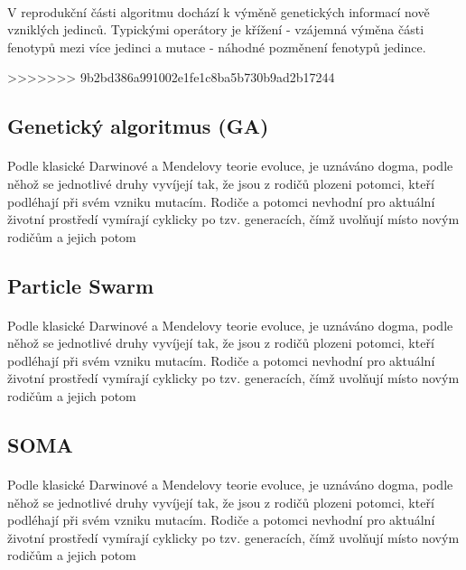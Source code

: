 \documentclass[bc,male,java,dept460]{diploma}		%
\begin{document}
\paragraph*{}
V reprodukční části algoritmu dochází k výměně genetických informací nově vzniklých jedinců. Typickými operátory je křížení - vzájemná výměna části fenotypů mezi více jedinci a mutace - náhodné pozměnení fenotypů jedince.

>>>>>>> 9b2bd386a991002e1fe1c8ba5b730b9ad2b17244
\subsection{Genetický algoritmus (GA)}
\paragraph*{}
Podle klasické Darwinové a Mendelovy teorie evoluce, je uznáváno dogma, podle něhož se jednotlivé druhy vyvíjejí tak, že jsou z rodičů plozeni potomci, kteří podléhají při svém vzniku mutacím. Rodiče a potomci nevhodní pro aktuální životní prostředí vymírají cyklicky po tzv. generacích, čímž uvolňují místo novým rodičům a jejich potom

\subsection{Particle Swarm}
\paragraph*{}
Podle klasické Darwinové a Mendelovy teorie evoluce, je uznáváno dogma, podle něhož se jednotlivé druhy vyvíjejí tak, že jsou z rodičů plozeni potomci, kteří podléhají při svém vzniku mutacím. Rodiče a potomci nevhodní pro aktuální životní prostředí vymírají cyklicky po tzv. generacích, čímž uvolňují místo novým rodičům a jejich potom

\subsection{SOMA}
\paragraph*{}
Podle klasické Darwinové a Mendelovy teorie evoluce, je uznáváno dogma, podle něhož se jednotlivé druhy vyvíjejí tak, že jsou z rodičů plozeni potomci, kteří podléhají při svém vzniku mutacím. Rodiče a potomci nevhodní pro aktuální životní prostředí vymírají cyklicky po tzv. generacích, čímž uvolňují místo novým rodičům a jejich potom
\end{document}
